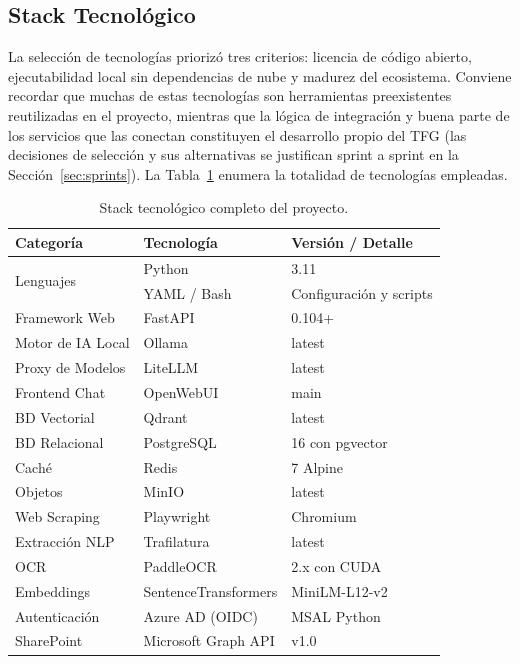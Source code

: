\subsection{Stack Tecnológico}

La selección de tecnologías priorizó tres criterios: licencia de código abierto, ejecutabilidad local sin dependencias de nube y madurez del ecosistema. Conviene recordar que muchas de estas tecnologías son herramientas preexistentes reutilizadas en el proyecto, mientras que la lógica de integración y buena parte de los servicios que las conectan constituyen el desarrollo propio del TFG (las decisiones de selección y sus alternativas se justifican sprint a sprint en la Sección~\ref{sec:sprints}). La Tabla~\ref{tab:stack} enumera la totalidad de tecnologías empleadas.

\begin{table}[H]
\centering
\caption{Stack tecnológico completo del proyecto.}
\label{tab:stack}
\begin{tabular}{lll}
\toprule
\textbf{Categoría} & \textbf{Tecnología} & \textbf{Versión / Detalle} \\
\midrule
\multirow{2}{*}{Lenguajes}      & Python      & 3.11 \\
                                  & YAML / Bash & Configuración y scripts \\
\midrule
Framework Web       & FastAPI      & 0.104+ \\
Motor de IA Local   & Ollama       & latest  \\
Proxy de Modelos    & LiteLLM      & latest  \\
Frontend Chat       & OpenWebUI    & main \\
\midrule
BD Vectorial        & Qdrant       & latest \\
BD Relacional       & PostgreSQL   & 16 con pgvector \\
Caché               & Redis        & 7 Alpine \\
Objetos             & MinIO        & latest \\
\midrule
Web Scraping        & Playwright   & Chromium \\
Extracción NLP      & Trafilatura  & latest \\
OCR                 & PaddleOCR    & 2.x con CUDA \\
\midrule
Embeddings          & SentenceTransformers & MiniLM-L12-v2 \\
Autenticación       & Azure AD (OIDC) & MSAL Python \\
SharePoint          & Microsoft Graph API & v1.0 \\

\end{tabular}
\end{table}
